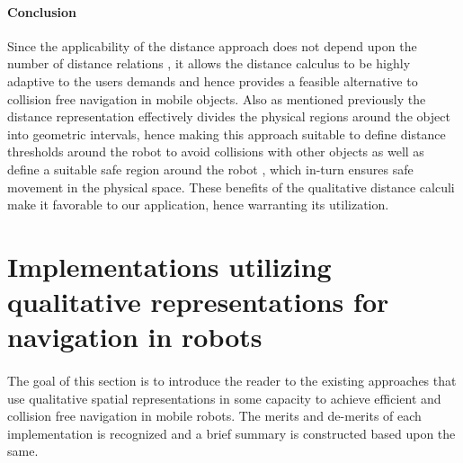 	\paragraph{Conclusion}Since the applicability of the distance approach does not depend upon the number of distance relations \cite{clementini1997qualitative}, it allows the distance calculus to be highly adaptive to the users demands and hence provides a feasible alternative to collision free navigation in mobile objects. Also as mentioned previously the distance representation effectively divides the physical regions around the object into geometric intervals, hence making this approach suitable to define distance thresholds around the robot to avoid collisions with other objects as well as define a suitable safe region around the robot \cite{lowe1975geography}, which in-turn ensures safe movement in the physical space. These benefits of the qualitative distance calculi make it favorable to our application, hence warranting its utilization.

	\section{Implementations utilizing qualitative representations for navigation in robots}
	\paragraph{} The goal of this section is to introduce the reader to the existing approaches that use qualitative spatial representations in some capacity to achieve efficient and collision free navigation in mobile robots. The merits and de-merits of each implementation is recognized and a brief summary is constructed based upon the same.
	
